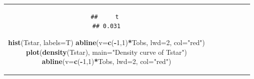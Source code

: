 \documentclass[]{book}
\newenvironment{Shaded}{\begin{snugshade}}{\end{snugshade}}
\newcommand{\KeywordTok}[1]{\textcolor[rgb]{0.13,0.29,0.53}{\textbf{#1}}}
\newcommand{\DataTypeTok}[1]{\textcolor[rgb]{0.13,0.29,0.53}{#1}}
\newcommand{\DecValTok}[1]{\textcolor[rgb]{0.00,0.00,0.81}{#1}}
\newcommand{\StringTok}[1]{\textcolor[rgb]{0.31,0.60,0.02}{#1}}
\newcommand{\OperatorTok}[1]{\textcolor[rgb]{0.81,0.36,0.00}{\textbf{#1}}}
\newcommand{\NormalTok}[1]{#1}
\theoremstyle{definition}
\theoremstyle{definition}
\theoremstyle{remark}
\begin{document}
\begin{longtable}[]{@{}ccccccc@{}}
\begin{minipage}[b]{0.10\columnwidth}
\begin{verbatim}
##     t 
## 0.031
\end{verbatim}

\begin{Shaded}
\begin{Highlighting}[]
\KeywordTok{hist}\NormalTok{(Tstar, }\DataTypeTok{labels=}\NormalTok{T)}
\KeywordTok{abline}\NormalTok{(}\DataTypeTok{v=}\KeywordTok{c}\NormalTok{(}\OperatorTok{-}\DecValTok{1}\NormalTok{,}\DecValTok{1}\NormalTok{)}\OperatorTok{*}\NormalTok{Tobs, }\DataTypeTok{lwd=}\DecValTok{2}\NormalTok{, }\DataTypeTok{col=}\StringTok{"red"}\NormalTok{)}
\KeywordTok{plot}\NormalTok{(}\KeywordTok{density}\NormalTok{(Tstar), }\DataTypeTok{main=}\StringTok{"Density curve of Tstar"}\NormalTok{)}
\KeywordTok{abline}\NormalTok{(}\DataTypeTok{v=}\KeywordTok{c}\NormalTok{(}\OperatorTok{-}\DecValTok{1}\NormalTok{,}\DecValTok{1}\NormalTok{)}\OperatorTok{*}\NormalTok{Tobs, }\DataTypeTok{lwd=}\DecValTok{2}\NormalTok{, }\DataTypeTok{col=}\StringTok{"red"}\NormalTok{)}
\end{Highlighting}
\end{Shaded}




\end{minipage}
\end{longtable}
\end{document}
